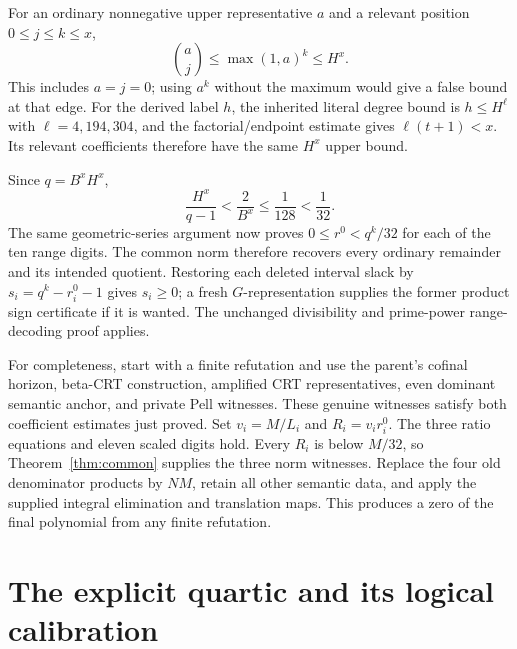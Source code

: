 \documentclass[11pt,letterpaper]{article}
\theoremstyle{remark}\newtheorem{remark}[theorem]{Remark}
\begin{document}
For an ordinary nonnegative upper representative $a$ and a relevant
position $0\le j\le k\le x$,
\[
 \binom aj\le\max(1,a)^k\le H^x.
\]
This includes $a=j=0$; using $a^k$ without the maximum would give a
false bound at that edge. For the derived label $h$, the inherited
literal degree bound is $h\le H^\ell$ with $\ell=4,194,304$, and the
factorial/endpoint estimate gives $\ell(t+1)<x$. Its relevant
coefficients therefore have the same $H^x$ upper bound.

Since $q=B^xH^x$,
\[
 \frac{H^x}{q-1}<\frac2{B^x}\le\frac1{128}<\frac1{32}.
\]
The same geometric-series argument now proves
$0\le r^0<q^k/32$ for each of the ten range digits. The common norm
therefore recovers every ordinary remainder and its intended quotient.
Restoring each deleted interval slack by $s_i=q^k-r_i^0-1$ gives
$s_i\ge0$; a fresh $G$-representation supplies the former product sign
certificate if it is wanted. The unchanged divisibility and prime-power
range-decoding proof applies.

For completeness, start with a finite refutation and use the parent's
cofinal horizon, beta-CRT construction, amplified CRT representatives,
even dominant semantic anchor, and private Pell witnesses. These genuine
witnesses satisfy both coefficient estimates just proved. Set
$v_i=M/L_i$ and $R_i=v_i r_i^0$. The three ratio equations and eleven
scaled digits hold. Every $R_i$ is below $M/32$, so
Theorem~\ref{thm:common} supplies the three norm witnesses. Replace the
four old denominator products by $NM$, retain all other semantic data,
and apply the supplied integral elimination and translation maps. This
produces a zero of the final polynomial from any finite refutation.

\section{The explicit quartic and its logical calibration}\label{sec:calibration}
\end{document}
